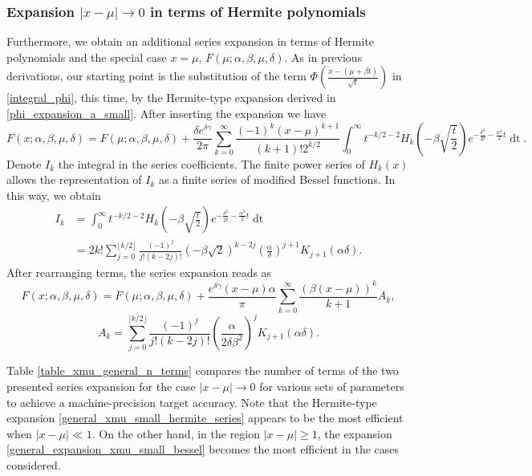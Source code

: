 \documentclass[10pt,a4paper,oneside]{article}
\numberwithin{equation}{section}
\begin{document}
\subsubsection{Expansion $|x-\mu| \to 0$ in terms of Hermite polynomials}
Furthermore, we obtain an additional series expansion in terms of Hermite polynomials and the special case $x=\mu$, $F(\mu; \alpha, \beta, \mu, \delta)$. As in previous derivations, our starting point is the substitution of the term $\Phi\left(\frac{x - (\mu +\beta t)}{\sqrt{t}}\right)$ in \eqref{integral_phi}, this time,
by the Hermite-type expansion derived in \eqref{phi_expansion_a_small}. After inserting the expansion we have
\begin{equation}
F(x; \alpha, \beta, \mu, \delta) = F(\mu; \alpha, \beta, \mu, \delta) + \frac{\delta e^{\delta \gamma}}{2\pi} \sum_{k=0}^{\infty}\frac{(-1)^k (x-\mu)^{k+1}}{(k + 1)! 2^{k/2}}\int_0^{\infty} t^{-k/2 - 2} H_k\left(-\beta\sqrt{\frac{t}{2}}\right) e^{-\frac{\delta^2}{2t} - \frac{\alpha^2}{2}t} \mathop{dt}.
\end{equation}
Denote $I_k$ the integral in the series coefficients. The finite power series of $H_k(x)$ \cite[\S 18.5.13]{NIST:DLMF} allows the representation of $I_k$ as a finite series of modified Bessel functions. In this way, we obtain
\begin{align}
I_k  &= \int_0^{\infty} t^{-k/2 - 2} H_k\left(-\beta\sqrt{\frac{t}{2}}\right) e^{-\frac{\delta^2}{2t} - \frac{\alpha^2}{2}t} \mathop{dt}\\
&= 2k! \sum_{j=0}^{\lfloor k/2 \rfloor} \frac{(-1)^j}{j!(k - 2j)!} (-\beta\sqrt{2})^{k - 2j} \left(\frac{\alpha}{\delta}\right)^{j+1} K_{j+1}(\alpha \delta).
\end{align}
After rearranging terms, the series expansion reads as
\begin{equation}\label{general_xmu_small_hermite_series}
F(x; \alpha, \beta, \mu, \delta) = F(\mu; \alpha, \beta, \mu, \delta) + \frac{e^{\delta \gamma} (x-\mu) \alpha}{\pi} \sum_{k=0}^{\infty} \frac{(\beta(x-\mu))^k}{k+1}A_k,
\end{equation}
\begin{equation}
A_k = \sum_{j=0}^{\lfloor k/2 \rfloor} \frac{(-1)^j}{j!(k - 2j)!} \left(\frac{\alpha}{2\delta \beta^2}\right)^j K_{j+1}(\alpha \delta).
\end{equation}

Table \ref{table_xmu_general_n_terms} compares the number of terms of the two presented series expansion for the case $|x-\mu| \to 0$ for various sets of parameters to achieve a machine-precision target accuracy. Note that the Hermite-type expansion \eqref{general_xmu_small_hermite_series} appears to be the most efficient when $|x-\mu| \ll 1$. On the other hand, in the region $|x-\mu| \ge 1$, the expansion \eqref{general_expansion_xmu_small_bessel} becomes the most efficient in the cases considered. 
\end{document}
